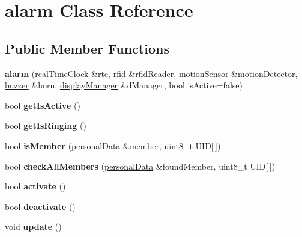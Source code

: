 \hypertarget{classalarm}{}\section{alarm Class Reference}
\label{classalarm}
\subsection*{Public Member Functions}
\begin{DoxyCompactItemize}
\item 
\mbox{\label{classalarm_a291b28fcd9ffcdcce8e8fce6e512643f}} 
{\bfseries alarm} (\mbox{\hyperlink{classreal_time_clock}{real\+Time\+Clock}} \&rtc, \mbox{\hyperlink{classrfid}{rfid}} \&rfid\+Reader, \mbox{\hyperlink{classmotion_sensor}{motion\+Sensor}} \&motion\+Detector, \mbox{\hyperlink{classbuzzer}{buzzer}} \&horn, \mbox{\hyperlink{classdisplay_manager}{display\+Manager}} \&d\+Manager, bool is\+Active=false)
\item 
\mbox{\label{classalarm_a6077fa2ce42a4b04cb3ebbdff7f112ea}} 
bool {\bfseries get\+Is\+Active} ()
\item 
\mbox{\label{classalarm_a04d2c03a06c2208e642ab55c2f5d3f17}} 
bool {\bfseries get\+Is\+Ringing} ()
\item 
\mbox{\label{classalarm_a32500531a9dc214f564aa20d5f0ee145}} 
bool {\bfseries is\+Member} (\mbox{\hyperlink{structpersonal_data}{personal\+Data}} \&member, uint8\+\_\+t U\+ID\mbox{[}$\,$\mbox{]})
\item 
\mbox{\label{classalarm_abfda60288cdb57e93c66e10ac36ed35e}} 
bool {\bfseries check\+All\+Members} (\mbox{\hyperlink{structpersonal_data}{personal\+Data}} \&found\+Member, uint8\+\_\+t U\+ID\mbox{[}$\,$\mbox{]})
\item 
\mbox{\label{classalarm_aed3ea13689f0461908659d36fc895c16}} 
bool {\bfseries activate} ()
\item 
\mbox{\label{classalarm_a242729ba99732c31170dcfe80050d405}} 
bool {\bfseries deactivate} ()
\item 
\mbox{\label{classalarm_a008a838ccc2b272900f089f765629841}} 
void {\bfseries update} ()
\end{DoxyCompactItemize}
